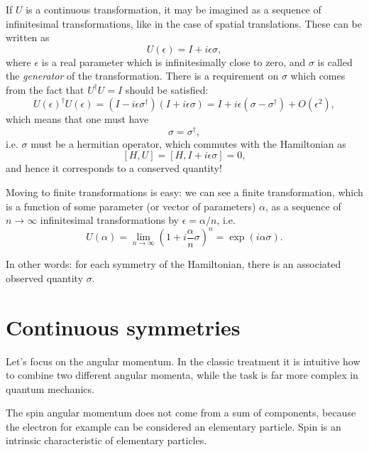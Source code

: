 If $U$ is a continuous transformation, it may be imagined as a sequence of infinitesimal transformations, like in the case of spatial translations. These can be written as
\[
U(\epsilon) = I + i\epsilon \sigma,
\]
where $\epsilon$ is a real parameter which is infinitesimally close to zero, and $\sigma$ is called the \emph{generator} of the transformation. There is a requirement on $\sigma$ which comes from the fact that $U^\dag U=I$ should be satisfied:
\[
U(\epsilon)^\dag U(\epsilon) = (I-i\epsilon\sigma^\dag)(I+i\epsilon\sigma) = I + i\epsilon(\sigma - \sigma^\dag) + O(\epsilon^2),
\]
which means that one must have
\[
\sigma=\sigma^\dag,
\]
i.e.  $\sigma$ must be a hermitian operator, which commutes with the Hamiltonian as
\[
[H,U] = [H, I+i\epsilon\sigma] = 0,
\]
and hence it corresponds to a conserved quantity!

Moving to finite transformations is easy: we can see a finite transformation, which is a function of some parameter (or vector of parameters) $\alpha$, as a sequence of $n\rightarrow\infty$ infinitesimal transformations by $\epsilon=\alpha/n$, i.e. 
\[
U(\alpha) = \lim_{n\rightarrow\infty} \left(1+i\frac{\alpha}{n} \sigma\right)^n = \exp\left(i\alpha \sigma\right).
\]

In other words: for each symmetry of the Hamiltonian, there is an associated observed quantity $\sigma$.


\section{Continuous symmetries}
Let's focus on the angular momentum. In the classic treatment it is intuitive how to combine two different angular momenta, while the task is far more complex in quantum mechanics.

The spin angular momentum does not come from a sum of components, because the electron for example can be considered an elementary particle. Spin is an intrinsic characteristic of elementary particles.

